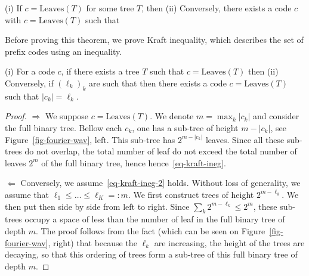\begin{thm}
	(i) If $c=\text{Leaves}(T)$ for some tree $T$, then 
	(ii) Conversely, there exists a code $c$ with $c=\text{Leaves}(T)$ such that 
\end{thm} 

Before proving this theorem, we prove Kraft inequality, which describes the set of prefix codes using an inequality.

\begin{lem}\label{lem-kraft}
	(i) For a code $c$, if there exists a tree $T$ such that $c=\text{Leaves}(T)$ then
	(ii) Conversely, if $(\ell_k)_k$ are such that
	then there exists a code $c=\text{Leaves}(T)$ such that $|c_k|=\ell_k$.
\end{lem} 

\begin{proof}
	$\Rightarrow$ We suppose $c=\text{Leaves}(T)$. We denote $m=\max_k |c_k|$ and consider the full binary tree.
	Bellow each $c_k$, one has a sub-tree of height $m-|c_k|$, see Figure~\ref{fig-fourier-wav}, left. This sub-tree has $2^{m-|c_k|}$ leaves. Since all these sub-trees do not overlap, the total number of leaf do not exceed the total number of leaves $2^m$ of the full binary tree, hence
	hence~\eqref{eq-kraft-ineg}.
	

	
	$\Leftarrow$ Conversely, we assume~\eqref{eq-kraft-ineg-2} holds. Without loss of generality, we assume that $\ell_1 \leq \ldots \leq \ell_K =: m$. 
	We first construct trees of height $2^{m-\ell_k}$. We then put then side by side from left to right. 
	Since $\sum_k 2^{m-\ell_k} \leq 2^m$, these sub-trees occupy a space of less than the number of leaf in the full binary tree of depth $m$. 
	The proof follows from the fact (which can be seen on Figure~\ref{fig-fourier-wav}, right) that because the $\ell_k$ are increasing, the height of the trees are decaying, so that this ordering of trees form a sub-tree of this full binary tree of depth $m$.
\end{proof}




